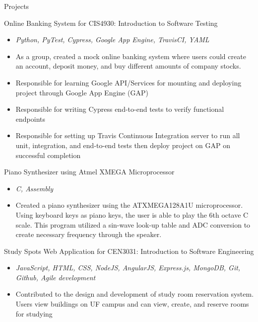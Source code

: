 \documentclass{article}
\newlength{\tabin}
\newlength{\secsep}
\newcommand{\lineunder}{\vspace*{-8pt} \\ \hspace*{-6pt} \hrulefill \\ \vspace*{-15pt}}
\newenvironment{tabbedsection}[1]{
  \begin{list}{}{
      \setlength{\itemsep}{0pt}
      \setlength{\labelsep}{0pt}
      \setlength{\labelwidth}{0pt}
      \setlength{\leftmargin}{\tabin}
      \setlength{\rightmargin}{\tabin}
      \setlength{\listparindent}{0pt}
      \setlength{\parsep}{0pt}
      \setlength{\parskip}{0pt}
      \setlength{\partopsep}{0pt}
      \setlength{\topsep}{#1}
    }
  \item[]
}{\end{list}}
\newenvironment{resume_section}[1]{ 
  \filbreak
  \vspace{2\secsep}
  \MakeUppercase{ \large#1}
  \lineunder
  \begin{tabbedsection}{\secsep}
}{\end{tabbedsection}}
\newenvironment{resume_subsection}[2][]{
  \textbf{#2} \hfill {\footnotesize #1} \hspace{2em}
  \begin{tabbedsection}{0.5\secsep}
}{\end{tabbedsection}}
\newenvironment{subitems}{
  \renewcommand{\labelitemi}{-}
  \begin{itemize}
      \setlength{\labelsep}{1em}
}{\end{itemize}}
\begin{document}
\begin{resume_section}{Projects}

 \begin{resume_subsection}[]{Online Banking System for CIS4930: Introduction to Software Testing}
  \begin{subitems}
    \item \textit{Python, PyTest, Cypress, Google App Engine, TravisCI, YAML}
    \item As a group, created a mock online banking system where users could create an account, deposit money, and buy different amounts of company stocks.
    \item Responsible for learning Google API/Services for mounting and deploying project through Google App Engine (GAP)
    \item Responsible for writing Cypress end-to-end tests to verify functional endpoints
    \item Responsible for setting up Travis Continuous Integration server to run all unit, integration, and end-to-end tests then deploy project on GAP on successful completion
    \end{subitems}
  \end{resume_subsection}

  \begin{resume_subsection}[]{Piano Synthesizer using Atmel XMEGA Microprocessor}
  \begin{subitems}
    \item \textit{C, Assembly}
    \item Created a  piano synthesizer using the ATXMEGA128A1U microprocessor. Using keyboard keys as piano keys, the user is able to play the 6th octave C scale. This program utilized a sin-wave look-up table and ADC conversion to create necessary frequency through the speaker.
    \end{subitems}
  \end{resume_subsection}
  
   \begin{resume_subsection}[]{Study Spots Web Application for CEN3031: Introduction to Software Engineering}
  \begin{subitems}
    \item \textit{JavaScript, HTML, CSS, NodeJS, AngularJS, Express.js, MongoDB, Git, Github, Agile development}
    \item Contributed to the design and development of study room reservation system. Users view buildings on UF campus and can view, create, and reserve rooms for studying
    \end{subitems}
  \end{resume_subsection}
\end{resume_section}
\end{document}
